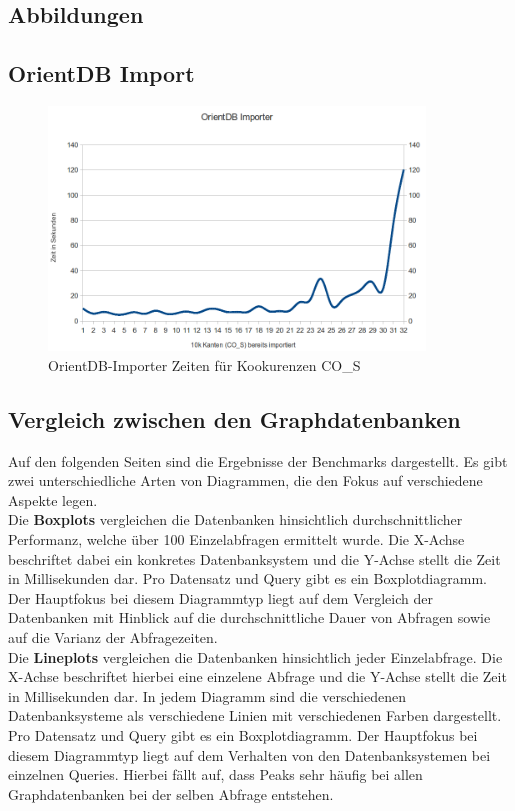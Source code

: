 \documentclass[11pt, a4paper, oneside]{article} %
\begin{document}
\newpage

\begin{appendix}
\section{Abbildungen}
\subsection{OrientDB Import}
\begin{figure}[htbp]
	\centering
	\includegraphics[width=10cm]{OrientImporter.png} 
	\caption{OrientDB-Importer Zeiten für Kookurenzen CO\_{}S}
	\label{fig:orientdb_import}
\end{figure}

\subsection{Vergleich zwischen den Graphdatenbanken}
Auf den folgenden Seiten sind die Ergebnisse der Benchmarks dargestellt. Es gibt zwei unterschiedliche Arten von Diagrammen, die den Fokus auf verschiedene Aspekte legen. \\
Die \textbf{Boxplots} vergleichen die Datenbanken hinsichtlich durchschnittlicher Performanz, welche über 100 Einzelabfragen ermittelt wurde. Die X-Achse beschriftet dabei ein konkretes Datenbanksystem und die Y-Achse stellt die Zeit in Millisekunden dar. Pro Datensatz und Query gibt es ein Boxplotdiagramm. Der Hauptfokus bei diesem Diagrammtyp liegt auf dem Vergleich der Datenbanken mit Hinblick auf die durchschnittliche Dauer von Abfragen sowie auf die Varianz der Abfragezeiten.\\
Die \textbf{Lineplots} vergleichen die Datenbanken hinsichtlich jeder Einzelabfrage. Die X-Achse beschriftet hierbei eine einzelene Abfrage und die Y-Achse stellt die Zeit in Millisekunden dar. In jedem Diagramm sind die verschiedenen Datenbanksysteme als verschiedene Linien mit verschiedenen Farben dargestellt. Pro Datensatz und Query gibt es ein Boxplotdiagramm. Der Hauptfokus bei diesem Diagrammtyp liegt auf dem Verhalten von den Datenbanksystemen bei einzelnen Queries. Hierbei fällt auf, dass Peaks sehr häufig bei allen Graphdatenbanken bei der selben Abfrage entstehen.


\end{appendix}
\end{document}
